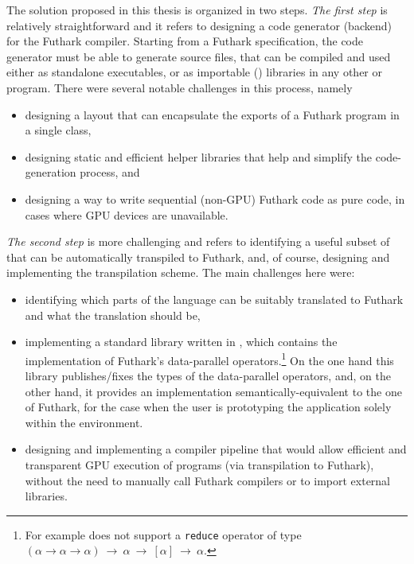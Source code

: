 The solution proposed in this thesis is organized in two steps. 
{\em The first step} is relatively straightforward and it refers to designing a \csharp{} 
code generator (backend) for the Futhark compiler. Starting from a Futhark specification,
the code generator must be able to generate \csharp{} source
files, that can be compiled and used either as standalone executables, or as
importable (\csharp{}) libraries in any other \csharp{} or \fsharp{} program.
There were several notable challenges in this process, namely 
\begin{itemize}
    \item designing a layout that can encapsulate the exports of a Futhark program
            in a single \csharp{} class, 
    \item designing static and efficient helper libraries that help and simplify
            the code-generation process, and
    \item designing a way to write sequential (non-GPU) Futhark code as pure 
            \csharp{} code, in cases where GPU devices are unavailable.
\end{itemize}

{\em The second step} is more challenging and refers to identifying a useful 
subset of \fsharp{} that can be automatically transpiled to Futhark, and, of
course, designing and implementing the transpilation scheme.
%
The main challenges here were:
\begin{itemize} 
    \item identifying which parts of the \fsharp{} language can be suitably
             translated to Futhark and what the translation should be, 
    \item implementing a standard library written in \fsharp{}, which contains
            the implementation of Futhark's data-parallel operators.\footnote{
             For example \fsharp{} does not support a {\tt reduce} operator of type 
            $(\alpha\rightarrow\alpha\rightarrow\alpha)~\rightarrow~\alpha~\rightarrow~[\alpha]~\rightarrow~\alpha$.}
            On the one hand this library publishes/fixes the types of the
            data-parallel operators, and, on the other hand, it provides an 
            implementation semantically-equivalent to the one of Futhark, 
            for the case when the user is prototyping the application
            solely within the \fsharp{} environment.
    \item designing and implementing a compiler pipeline that would allow
            efficient and transparent GPU execution of \fsharp{} programs
            (via transpilation to Futhark), without the need to manually 
            call Futhark compilers or to import external libraries.
\end{itemize}

